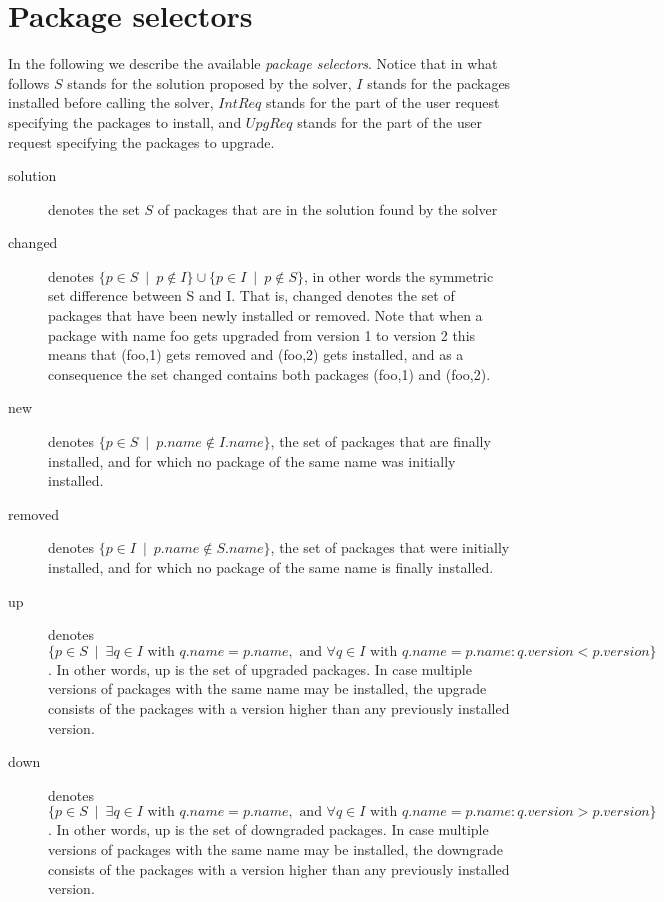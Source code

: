 \documentclass{article}
\begin{document}
\section{Package selectors}

In the following we describe the available \emph{package selectors}. Notice that in what follows
$S$ stands for the solution proposed by the solver, $I$ stands for the packages installed
before calling the solver, $IntReq$ stands for the part of the user request specifying
the packages to install, and $UpgReq$ stands for the part of the user request specifying
the packages to upgrade.

\begin{description}
  \item[solution] denotes the set $S$ of packages that are in the solution found by the solver
  \item[changed] denotes $\{p \in S ~\mid~  p \not\in I\} \cup \{p \in I ~\mid~  p
    \not\in S\}$, in other words the symmetric set difference between S and
    I. That is, changed denotes the set of packages that have been newly
    installed or removed. Note that when a package with name foo gets upgraded
    from version 1 to version 2 this means that (foo,1) gets removed and
    (foo,2) gets installed, and as a consequence the set changed contains both
    packages (foo,1) and (foo,2).
  \item[new] denotes $\{ p \in S ~\mid~  p.name \not\in I.name \}$, the set of
    packages that are finally installed, and for which no package of the same
    name was initially installed.
  \item[removed] denotes $\{ p \in I ~\mid~  p.name \not\in S.name \}$, the set of
    packages that were initially installed, and for which no package of the
    same name is finally installed.
  \item[up] denotes $\{ p \in S ~\mid~  \exists q \in I \mbox{ with } q.name = p.name, \mbox{ and } \forall q \in I
    \mbox{ with } q.name = p.name : q.version < p.version\}$. 
    In other words, up is the set of upgraded packages. In case multiple
    versions of packages with the same name may be installed, the upgrade
    consists of the packages with a version higher than any previously
    installed version.
  \item[down] denotes $\{ p \in S ~\mid~  \exists q \in I \mbox{ with } q.name = p.name, \mbox{ and } \forall q \in I
    \mbox{ with } q.name = p.name : q.version > p.version\}$. 
    In other words, up is the set of downgraded packages. In case multiple
    versions of packages with the same name may be installed, the downgrade
    consists of the packages with a version higher than any previously
    installed version.
\end{description}
\end{document}
